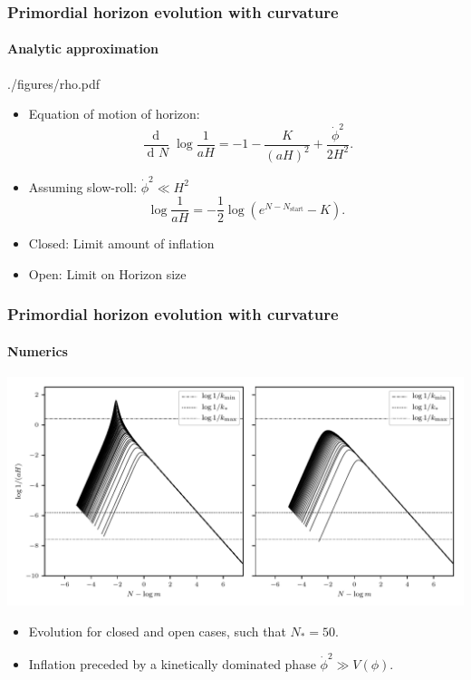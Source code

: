 \documentclass[%
]{beamer}
\renewcommand{\d}[2][]{\operatorname{d}^{#1}\!{#2}}
\begin{document}
\begin{frame}
    \frametitle{Primordial horizon evolution with curvature}
    \framesubtitle{Analytic approximation}
    \begin{figright}[0.45]{./figures/rho.pdf}
        \begin{itemize}
            \item Equation of motion of horizon:
                \begin{equation*}
                    \frac{\d{}}{\d{N}}\log \frac{1}{aH} = -1 - \frac{K}{{(aH)}^2} + \frac{\dot{\phi}^2}{2H^2}.
                \end{equation*}
            \item Assuming slow-roll: $\dot{\phi}^2 \ll H^2$
                \begin{equation*}
                    \log\frac{1}{aH} = -\frac{1}{2}\log{\left( e^{N-N_\mathrm{start}} - K \right)}.
                \end{equation*}
            \item Closed: Limit amount of inflation
            \item Open: Limit on Horizon size
        \end{itemize}
    \end{figright}
\end{frame}

\begin{frame}
    \frametitle{Primordial horizon evolution with curvature}
    \framesubtitle{Numerics}
    \includegraphics[width=\textwidth]{./figures/horizon_kinetic.pdf}
    \begin{itemize}
        \item Evolution for closed and open cases, such that $N_*=50$.
        \item Inflation preceded by a kinetically dominated phase $\dot{\phi}^2\gg V(\phi)$.
    \end{itemize}
\end{frame}
\end{document}
